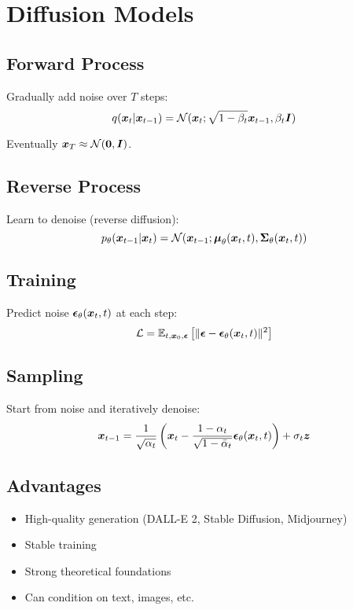 
\section{Diffusion Models}
\label{sec:diffusion-models}

\subsection{Forward Process}

Gradually add noise over $T$ steps:
\begin{equation}
q(\boldsymbol{x}_t|\boldsymbol{x}_{t-1}) = \mathcal{N}(\boldsymbol{x}_t; \sqrt{1-\beta_t} \boldsymbol{x}_{t-1}, \beta_t \boldsymbol{I})
\end{equation}

Eventually $\boldsymbol{x}_T \approx \mathcal{N}(\boldsymbol{0}, \boldsymbol{I})$.

\subsection{Reverse Process}

Learn to denoise (reverse diffusion):
\begin{equation}
p_{\theta}(\boldsymbol{x}_{t-1}|\boldsymbol{x}_t) = \mathcal{N}(\boldsymbol{x}_{t-1}; \boldsymbol{\mu}_{\theta}(\boldsymbol{x}_t, t), \boldsymbol{\Sigma}_{\theta}(\boldsymbol{x}_t, t))
\end{equation}

\subsection{Training}

Predict noise $\boldsymbol{\epsilon}_{\theta}(\boldsymbol{x}_t, t)$ at each step:
\begin{equation}
\mathcal{L} = \mathbb{E}_{t, \boldsymbol{x}_0, \boldsymbol{\epsilon}}\left[\|\boldsymbol{\epsilon} - \boldsymbol{\epsilon}_{\theta}(\boldsymbol{x}_t, t)\|^2\right]
\end{equation}

\subsection{Sampling}

Start from noise and iteratively denoise:
\begin{equation}
\boldsymbol{x}_{t-1} = \frac{1}{\sqrt{\alpha_t}}\left(\boldsymbol{x}_t - \frac{1-\alpha_t}{\sqrt{1-\bar{\alpha}_t}}\boldsymbol{\epsilon}_{\theta}(\boldsymbol{x}_t, t)\right) + \sigma_t \boldsymbol{z}
\end{equation}

\subsection{Advantages}

\begin{itemize}
    \item High-quality generation (DALL-E 2, Stable Diffusion, Midjourney)
    \item Stable training
    \item Strong theoretical foundations
    \item Can condition on text, images, etc.
\end{itemize}

